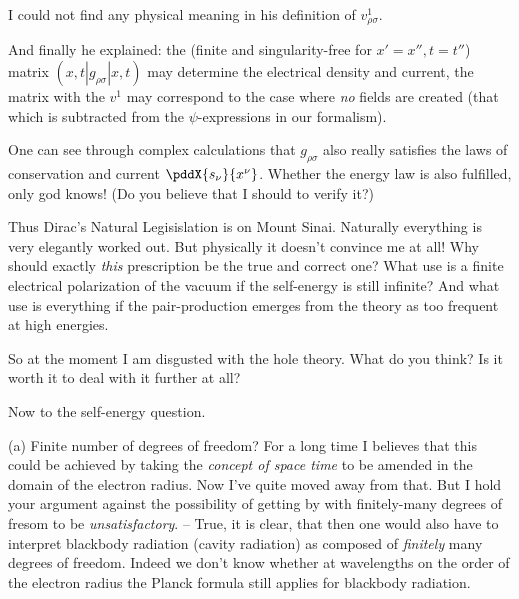 \documentclass{article}
\begin{document}
I could not find any physical meaning in his definition of $v_{\rho\sigma}^1$.

And finally he explained: the (finite and singularity-free for $x'=x'',t=t''$) matrix $(x,t|g_{\rho\sigma}|x,t)$ may determine the electrical density and current, the matrix with the $v^1$ may correspond to the case where \textit{no} fields are created (that which is subtracted from the $\psi$-expressions in our formalism).

One can see through complex calculations that $g_{\rho\sigma}$ also really satisfies the laws of conservation and current $\pddX{s_\nu}{x^\nu}$. Whether the energy law is also fulfilled, only god knows! (Do you believe that I should  to verify it?)

Thus Dirac's Natural Legisislation is on Mount Sinai. Naturally everything is very elegantly worked out. But physically it doesn't convince me at all! Why should exactly \textit{this} prescription be the true and correct one? What use is a finite electrical polarization of the vacuum if the self-energy is still infinite? And what use is everything if the pair-production emerges from the theory as too frequent at high energies.

So at the moment I am disgusted with the hole theory. What do you think? Is it worth it to deal with it further at all?

Now to the self-energy question.

(a) Finite number of degrees of freedom? For a long time I believes that this could be achieved by taking the \textit{concept of space time} to be amended in the domain of the electron radius. Now I've quite moved away from that. But I hold your argument against the possibility of getting by with finitely-many degrees of fresom to be \textit{unsatisfactory}. -- True, it is clear, that then one would also have to interpret blackbody radiation (cavity radiation) as composed of \textit{finitely} many degrees of freedom. Indeed we don't know whether at wavelengths on the order of the electron radius the Planck formula still applies for blackbody radiation.
\end{document}
